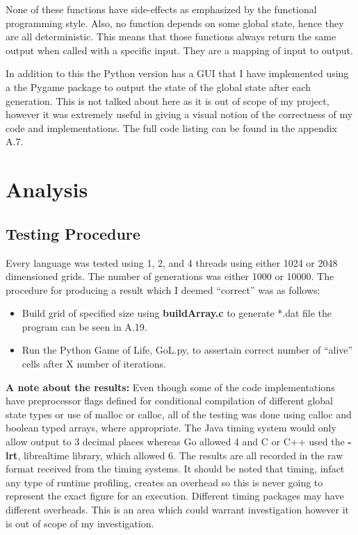 \documentclass[11pt]{article} %
\begin{document}
None of these functions have side-effects as emphasized by the functional programming style. Also, no function depends on some global state, hence they are all deterministic. This means that those functions always return the same output when called with a specific input. They are a mapping of input to output.

In addition to this the Python version has a GUI that I have implemented using a the Pygame package to output the state of the global state after each generation. This is not talked about here as it is out of scope of my project, however it was extremely useful in giving a visual notion of the correctness of my code and implementations. The full code listing can be found in the appendix A.7.
\section{Analysis}
\subsection{Testing Procedure}
Every language was tested using 1, 2, and 4 threads using either 1024 or 2048 dimensioned grids. The number of generations was either 1000 or 10000. The procedure for producing a result which I deemed ``correct'' was as follows:
\begin{itemize}
\item Build grid of specified size using {\bf buildArray.c} to generate *.dat file the program can be seen in A.19.
\item Run the Python Game of Life, GoL.py, to assertain correct number of ``alive'' cells after X number of iterations.
\end{itemize}
\begin{mdframed}
{\bf A note about the results:} Even though some of the code implementations have preprocessor flags defined for conditional compilation of different global state types or use of malloc or calloc, all of the testing was done using calloc and boolean typed arrays, where appropriate. The Java timing system would only allow output to 3 decimal places whereas Go allowed 4 and C or C++ used the {\bf -lrt}, librealtime library, which allowed 6. The results are all recorded in the raw format received from the timing systems. It should be noted that timing, infact any type of runtime profiling, creates an overhead so this is never going to represent the exact figure for an execution. Different timing packages may have different overheads. This is an area which could warrant investigation however it is out of scope of my investigation.
\end{mdframed}
\end{document}
